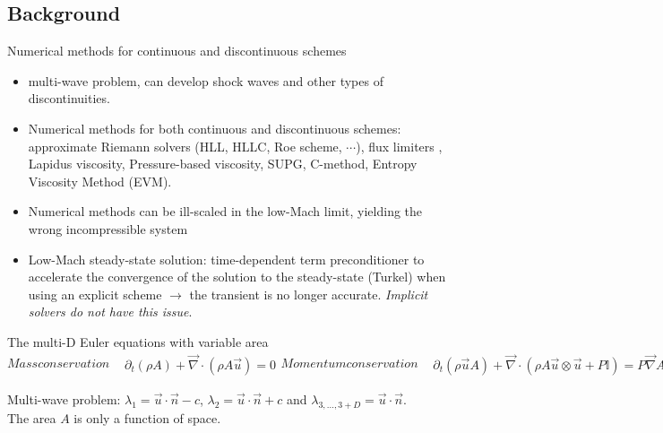 \documentclass[xcolor=dvipsnames,10pt]{beamer}
\renewcommand{\div}{\vec{\nabla}\! \cdot \!}
\newcommand{\grad}{\vec{\nabla}}
\newcommand{\tcr}[1]{\textcolor{red}{#1}}
\begin{document}
\subsection{Background}
\begin{frame}
\begin{block}{Numerical methods for continuous and discontinuous schemes}
\begin{itemize}
\setlength{\itemsep}{10pt}
\item multi-wave problem, can develop shock waves and other types of discontinuities. 
\item Numerical methods for both continuous and discontinuous schemes: approximate Riemann solvers (HLL, HLLC, Roe scheme, $\cdots$), flux limiters
, Lapidus viscosity, Pressure-based viscosity, SUPG, C-method, Entropy Viscosity Method (EVM). 
\item Numerical methods can be ill-scaled in the low-Mach limit, yielding the wrong incompressible system 
\item Low-Mach steady-state solution: time-dependent term preconditioner to accelerate the convergence of the solution to the steady-state (Turkel) when using an explicit scheme $\to$ the transient is no longer accurate. \emph{Implicit solvers do not have this issue}. 
\end{itemize}
\end{block}
\end{frame}
\begin{frame}
\begin{block}{The multi-D Euler equations with variable area}
\begin{subequations}
Mass conservation
\begin{align}
&\partial_t ( \rho A ) + \div \left( \rho A \vec{u} \right) = 0 \nonumber
\end{align}
Momentum conservation
\begin{align}
&\partial_t ( \rho \vec{u} A ) + \div \left( \rho A \vec{u} \otimes \vec{u} + P \mathbb{I} \right) = P \grad A \nonumber
\end{align}
Energy conservation
\begin{align}
&\partial_t ( \rho E A ) + \div \left[ \vec{u} \left( \rho E + P \right) A \right] = 0 \nonumber
\end{align}
Equation of state
\begin{align}
& P = eos \left( \rho, e \right) \nonumber 
\end{align}
\end{subequations}
\end{block}
Multi-wave problem: $\lambda_1 = \vec{u} \cdot \vec{n} - c $, $\lambda_2 = \vec{u} \cdot \vec{n} + c $ and $\lambda_{3, \dots, 3+D} = \vec{u} \cdot \vec{n}$. \\
The area $A$ is only a function of space.
\end{frame}
\end{document}

